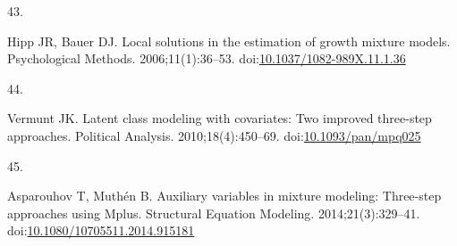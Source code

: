 \documentclass[
  11pt,
]{article}
\newlength{\cslhangindent}
\newlength{\csllabelwidth}
\newenvironment{CSLReferences}[2] %
 {\begin{list}{}{%
  \setlength{\itemindent}{0pt}
  \setlength{\leftmargin}{0pt}
  \setlength{\parsep}{0pt}
  \ifodd #1
   \setlength{\leftmargin}{\cslhangindent}
   \setlength{\itemindent}{-1\cslhangindent}
  \fi
  \setlength{\itemsep}{#2\baselineskip}}}
 {\end{list}}
\newcommand{\CSLLeftMargin}[1]{\parbox[t]{\csllabelwidth}{\strut#1\strut}}
\newcommand{\CSLRightInline}[1]{\parbox[t]{\linewidth - \csllabelwidth}{\strut#1\strut}}
\begin{document}
\begin{CSLReferences}{0}{1}
\CSLLeftMargin{43. }%
\CSLRightInline{Hipp JR, Bauer DJ. Local solutions in the estimation of growth mixture models. Psychological Methods. 2006;11(1):36--53. doi:\href{https://doi.org/10.1037/1082-989X.11.1.36}{10.1037/1082-989X.11.1.36}}

\CSLLeftMargin{44. }%
\CSLRightInline{Vermunt JK. Latent class modeling with covariates: Two improved three-step approaches. Political Analysis. 2010;18(4):450--69. doi:\href{https://doi.org/10.1093/pan/mpq025}{10.1093/pan/mpq025}}

\CSLLeftMargin{45. }%
\CSLRightInline{Asparouhov T, Muthén B. Auxiliary variables in mixture modeling: Three-step approaches using {M}plus. Structural Equation Modeling. 2014;21(3):329--41. doi:\href{https://doi.org/10.1080/10705511.2014.915181}{10.1080/10705511.2014.915181}}

\end{CSLReferences}
\end{document}

